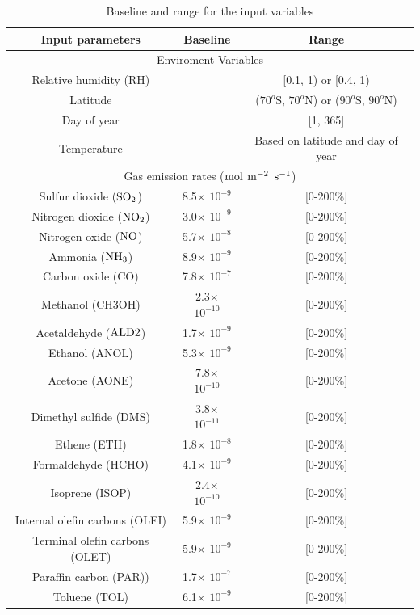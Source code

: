 \documentclass[edeposit,fullpage]{uiucthesis2009}
\begin{document}
\begin{table}
\centering
\caption{Baseline and range for the input variables}
\label{tab:input}
\begin{tabular}{ c c c  }
	\hline
	Input parameters  & Baseline & Range  \\
	\hline
	\multicolumn{3}{c}{Enviroment Variables} \\
	\hline
    Relative humidity (RH)&&[0.1, 1) or [0.4, 1) \\
    Latitude & &($70^o$S, $70^o$N) or ($90^o$S, $90^o$N)  \\
    Day of year & & [1, 365]\\
    Temperature & & Based on latitude and day of year\\
    \hline
    \multicolumn{3}{c}{Gas emission rates ($\rm mol$ $\rm m^{-2}$ $\rm s^{-1}$)} \\
    \hline
    Sulfur dioxide ($\rm SO_2$)&8.5$\times$ $10^{-9}$&[0-200\%] \\
    Nitrogen dioxide ($\rm NO_2$) &3.0$\times$ $10^{-9}$&[0-200\%]\\
    Nitrogen oxide ($\rm NO$) &5.7$\times$ $10^{-8}$& [0-200\%]\\
    Ammonia ($\rm NH_3$)&8.9$\times$ $10^{-9}$&[0-200\%] \\
    Carbon oxide (CO)&7.8$\times$ $10^{-7}$& [0-200\%]\\
    Methanol (CH3OH)&2.3$\times$ $10^{-10}$& [0-200\%]\\
    Acetaldehyde ($\rm ALD2$) &1.7$\times$ $10^{-9}$&[0-200\%] \\
    Ethanol (ANOL) &5.3$\times$ $10^{-9}$& [0-200\%]\\
    Acetone (AONE) &7.8$\times$ $10^{-10}$&[0-200\%]\\
    Dimethyl sulfide (DMS) &3.8$\times$ $10^{-11}$&[0-200\%] \\
    Ethene (ETH) &1.8$\times$ $10^{-8}$&[0-200\%] \\
    Formaldehyde (HCHO) &4.1$\times$ $10^{-9}$&[0-200\%] \\
    Isoprene (ISOP) &2.4$\times$ $10^{-10}$&[0-200\%] \\
    Internal olefin carbons (OLEI) &5.9$\times$ $10^{-9}$&[0-200\%]\\
   Terminal olefin carbons (OLET)&5.9$\times$ $10^{-9}$& [0-200\%]\\
   Paraffin carbon (PAR)) &1.7$\times$ $10^{-7}$&[0-200\%] \\
   Toluene (TOL) &6.1$\times$ $10^{-9}$&[0-200\%] \\

\end{tabular}
\end{table}
\end{document}
